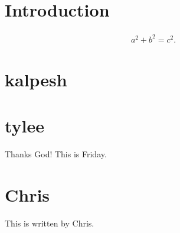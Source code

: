\documentclass{article}
\begin{document}
\section{Introduction}

\begin{align}
    a^2 + b^2 = c^2 .
\end{align}

\section{kalpesh}



\section{tylee}

Thanks God! This is Friday.

\section{Chris}

This is written by Chris.
\end{document}
